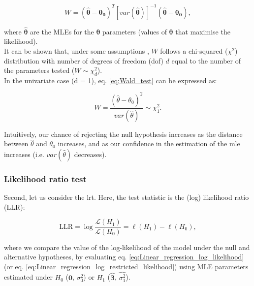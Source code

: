 \begin{equation}\label{eq:Wald_test}
W = (\hat{\boldsymbol{\theta}}-\boldsymbol{\theta_0})^T [var(\boldsymbol{\hat{\theta}})]^{-1}(\hat{\boldsymbol{\theta}}-\boldsymbol{\theta_0}), 
\end{equation}

where $\hat{\boldsymbol{\theta}}$ are the MLEs for the $\boldsymbol{\theta}$ parameters (values of $\boldsymbol{\theta}$ that maximise the likelihood).\\

It can be shown that, under some assumptions \cite{wald1943tests}, $W$ follows a chi-squared ($\chi^2$) distribution with number of degrees of freedom (dof) $d$ equal to the number of the parameters tested ($W \sim \chi^2_d $).\\

In the univariate case (d = 1), eq. \eqref{eq:Wald_test} can be expressed as:

\begin{equation}\label{eq:Wald_test_univariate}
    W = \frac{(\hat{\theta}-\theta_0)^2}{var(\hat{\theta})} \sim \chi^2_1.
\end{equation}

Intuitively, our chance of rejecting the null hypothesis increases as the distance between $\hat{\theta}$ and $\theta_0$ increases, and as our confidence in the estimation of the \gls{mle} increases (i.e. $var(\hat{\theta})$ decreases).

\newpage

\subsubsection{Likelihood ratio test}

Second, let us consider the \gls{lrt}.
Here, the test statistic is the (log) likelihood ratio ($\mathrm{LLR}$):

\begin{equation}\label{eq:log_likelihood_ratio}
\mathrm{LLR} = \log \frac{\mathcal{L}(H_1)}{\mathcal{L}(H_0)} = \ell(H_1) - \ell(H_0), 
\end{equation}

where we compare the value of the log-likelihood of the model under the null and alternative hypotheses, by evaluating eq. \eqref{eq:Linear_regression_log_likelihood} (or eq. \eqref{eq:Linear_regression_log_restricted_likelihood}) using MLE parameters estimated under $H_0$ ($\mathbf{0}$, $\sigma_0^2$) or $H_1$ ($\hat{\boldsymbol{\beta}}$, $\hat{\sigma_1^2}$).  \\

